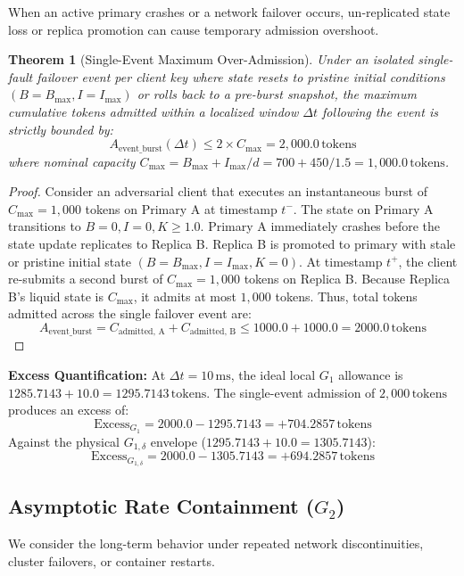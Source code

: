 \documentclass[conference]{IEEEtran}
\newtheorem{theorem}{Theorem}
\begin{document}
When an active primary crashes or a network failover occurs, un-replicated state loss or replica promotion can cause temporary admission overshoot.

\begin{theorem}[Single-Event Maximum Over-Admission]
Under an isolated single-fault failover event per client key where state resets to pristine initial conditions $(B=B_{\max}, I=I_{\max})$ or rolls back to a pre-burst snapshot, the maximum cumulative tokens admitted within a localized window $\Delta t$ following the event is strictly bounded by:
\begin{equation}
A_{\text{event\_burst}}(\Delta t) \le 2 \times C_{\max} = 2,000.0\,\text{tokens}
\end{equation}
where nominal capacity $C_{\max} = B_{\max} + I_{\max}/d = 700 + 450/1.5 = 1,000.0\,\text{tokens}$.
\end{theorem}

\begin{proof}
Consider an adversarial client that executes an instantaneous burst of $C_{\max} = 1,000$ tokens on Primary A at timestamp $t^-$. The state on Primary A transitions to $B=0, I=0, K \ge 1.0$. Primary A immediately crashes before the state update replicates to Replica B. Replica B is promoted to primary with stale or pristine initial state $(B=B_{\max}, I=I_{\max}, K=0)$. At timestamp $t^+$, the client re-submits a second burst of $C_{\max} = 1,000$ tokens on Replica B. Because Replica B's liquid state is $C_{\max}$, it admits at most $1,000$ tokens. Thus, total tokens admitted across the single failover event are:
$$A_{\text{event\_burst}} = C_{\text{admitted, A}} + C_{\text{admitted, B}} \le 1000.0 + 1000.0 = 2000.0\,\text{tokens}$$
\end{proof}

\textbf{Excess Quantification:} At $\Delta t = 10\,\text{ms}$, the ideal local $G_1$ allowance is $1285.7143 + 10.0 = 1295.7143\,\text{tokens}$. The single-event admission of $2,000\,\text{tokens}$ produces an excess of:
$$\text{Excess}_{G_1} = 2000.0 - 1295.7143 = +704.2857\,\text{tokens}$$
Against the physical $G_{1,\delta}$ envelope ($1295.7143 + 10.0 = 1305.7143$):
$$\text{Excess}_{G_{1,\delta}} = 2000.0 - 1305.7143 = +694.2857\,\text{tokens}$$

\subsection{Asymptotic Rate Containment ($G_2$)}
We consider the long-term behavior under repeated network discontinuities, cluster failovers, or container restarts.
\end{document}

